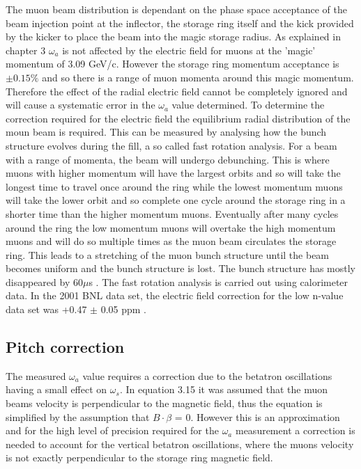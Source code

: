 The muon beam distribution is dependant on the phase space acceptance of the beam injection point at the inflector, the storage ring itself and the kick provided by the kicker to place the beam into the magic storage radius. As explained in chapter 3 $\omega_{a}$ is not affected by the electric field for muons at the 'magic' momentum of 3.09 GeV/c. However the storage ring momentum acceptance is $\pm{0.15}\%$ \cite{Reference29} and so there is a range of muon momenta around this magic momentum. Therefore the effect of the radial electric field cannot be completely ignored and will cause a systematic error in the $\omega_{a}$ value determined. To determine the correction required for the electric field the equilibrium radial distribution of the moun beam is required. This can be measured by analysing how the bunch structure evolves during the fill, a so called fast rotation analysis. For a beam with a range of momenta, the beam will undergo debunching. This is where muons with higher momentum will have the largest orbits and so will take the longest time to travel once around the ring while the lowest momentum muons will take the lower orbit and so complete one cycle around the storage ring in a shorter time than the higher momentum muons. Eventually after many cycles around the ring the low momentum muons will overtake the high momentum muons and will do so multiple times as the muon beam circulates the storage ring. This leads to a stretching of the muon bunch structure until the beam becomes uniform and the bunch structure is lost. The bunch structure has mostly disappeared by 60$\mu$s \cite{FR2}. 
The fast rotation analysis is carried out using calorimeter data. In the 2001 BNL data set, the electric field correction for the low n-value data set was +0.47 $\pm$ 0.05 ppm \cite{Reference13}.

\subsection{Pitch correction}

The measured $\omega_{a}$ value requires a correction due to the betatron oscillations having a small effect on $\omega_{s}$. In equation 3.15 it was assumed that the muon beams velocity is perpendicular to the magnetic field, thus the equation is simplified by the assumption that $B\cdot\beta$ = 0. However this is an approximation and for the high level of precision required for the $\omega_{a}$ measurement a correction is needed to account for the vertical betatron oscillations, where the muons velocity is not exactly perpendicular to the storage ring magnetic field.

